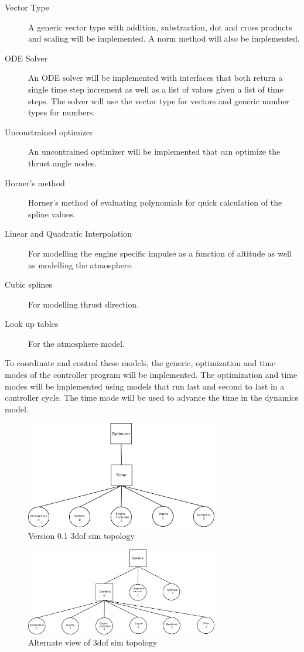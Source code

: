 \documentclass{book}
\begin{document}
\begin{description}
	\item[Vector Type] A generic vector type with addition, substraction, dot and cross products and scaling will be implemented. A norm method will also be implemented.
	\item[ODE Solver] An ODE solver will be implemented with interfaces that both return a single time step increment as well as a list of values given a list of time steps. The solver will use the vector type for vectors and generic number types for numbers.
	\item[Unconstrained optimizer] An uncontrained optimizer will be implemented that can optimize the thrust angle nodes.
	\item[Horner's method] Horner's method of evaluating polynomials for quick calculation of the spline values.
	\item[Linear and Quadratic Interpolation] For modelling the engine specific impulse as a function of altitude as well as modelling the atmosphere.
	\item[Cubic splines] For modelling thrust direction.
	\item[Look up tables] For the atmosphere model. 
\end{description}
To coordinate and control these models, the generic, optimization and time modes of the controller program will be implemented. The optimization and time modes will be implemented using models that run last and second to last in a controller cycle. The time mode will be used to advance the time in the dynamics model.

\begin{figure}[H]
\centering
\leavevmode
\includegraphics[width=0.75\textwidth]{01layout.pdf}
\caption{Version 0.1 3dof sim topology}
\label{01layout}
\end{figure}

\begin{figure}[H]
\begin{center}
\leavevmode
\includegraphics[width=0.75\textwidth]{01layoutalt.pdf}
\end{center}
\caption{Alternate view of 3dof sim topology}
\label{01layout_alt}
\end{figure}
\end{document}
